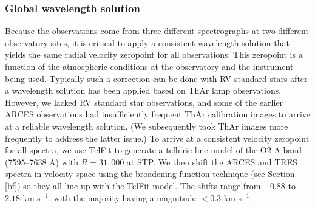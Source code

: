 \subsubsection{Global wavelength solution}\label{wavelength}
Because the observations come from three different spectrographs at two different observatory sites, it is critical to apply a consistent wavelength solution that yields the same radial velocity zeropoint for all observations. This zeropoint is a function of the atmospheric conditions at the observatory and the instrument being used. Typically such a correction can be done with RV standard stars after a wavelength solution has been applied based on ThAr lamp observations. However, we lacked RV standard star observations, and some of the earlier ARCES observations had insufficiently frequent ThAr calibration images to arrive at a reliable wavelength solution. (We subsequently took ThAr images more frequently to address the latter issue.) To arrive at a consistent velocity zeropoint for all spectra, we use TelFit \citep{gul14} to generate a telluric line model of the O2 A-band (7595--7638 \AA) with $R = 31,000$ at STP. We then shift the ARCES and TRES spectra in velocity space using the broadening function technique (see Section \ref{bf}) so they all line up with the TelFit model. The shifts range from $-0.88$ to $2.18$ km s$^{-1}$, with the majority having a magnitude $< 0.3$ km s$^{-1}$.
  
  
  